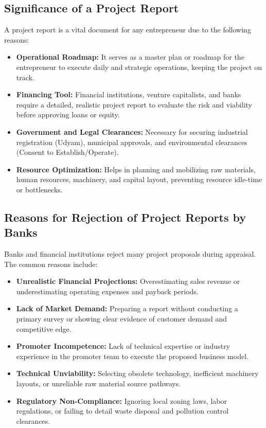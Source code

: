 \documentclass[12pt,a4paper]{article}
\begin{document}
\subsection{Significance of a Project Report}
A project report is a vital document for any entrepreneur due to the following reasons:
\begin{itemize}[leftmargin=*, itemsep=3pt]
  \item \textbf{Operational Roadmap:} It serves as a master plan or roadmap for the entrepreneur to execute daily and strategic operations, keeping the project on track.
  \item \textbf{Financing Tool:} Financial institutions, venture capitalists, and banks require a detailed, realistic project report to evaluate the risk and viability before approving loans or equity.
  \item \textbf{Government and Legal Clearances:} Necessary for securing industrial registration (Udyam), municipal approvals, and environmental clearances (Consent to Establish/Operate).
  \item \textbf{Resource Optimization:} Helps in planning and mobilizing raw materials, human resources, machinery, and capital layout, preventing resource idle-time or bottlenecks.
\end{itemize}

\subsection{Reasons for Rejection of Project Reports by Banks}
Banks and financial institutions reject many project proposals during appraisal. The common reasons include:
\begin{itemize}[leftmargin=*, itemsep=3pt]
  \item \textbf{Unrealistic Financial Projections:} Overestimating sales revenue or underestimating operating expenses and payback periods.
  \item \textbf{Lack of Market Demand:} Preparing a report without conducting a primary survey or showing clear evidence of customer demand and competitive edge.
  \item \textbf{Promoter Incompetence:} Lack of technical expertise or industry experience in the promoter team to execute the proposed business model.
  \item \textbf{Technical Unviability:} Selecting obsolete technology, inefficient machinery layouts, or unreliable raw material source pathways.
  \item \textbf{Regulatory Non-Compliance:} Ignoring local zoning laws, labor regulations, or failing to detail waste disposal and pollution control clearances.
\end{itemize}
\end{document}
